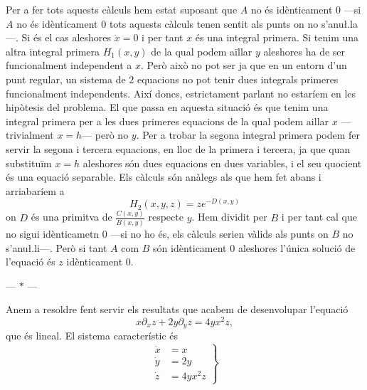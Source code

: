 \documentclass[12pt]{article}
\numberwithin{table}{section}
\numberwithin{equation}{section}
\numberwithin{figure}{section}
\newcommand{\parbreak}{
	\begin{center}
		--- $\ast$ ---
	\end{center} 
}
\begin{document}
Per a fer tots aquests càlculs hem estat suposant que \( A \) no és idènticament 0 ---si \( A \) no és idènticament 0 tots aquests càlculs tenen sentit als punts on no s'anu\l.la---. Si és el cas aleshores \( \dot{x} = 0 \) i per tant \( x \) és una integral primera. Si tenim una altra integral primera \( H_1(x,y) \) de la qual podem aïllar \( y \) aleshores ha de ser funcionalment independent a \( x \). Però això no pot ser ja que en un entorn d'un punt regular, un sistema de \( 2 \) equacions no pot tenir dues integrals primeres funcionalment independents. Així doncs, estrictament parlant no estaríem en les hipòtesis del problema. El que passa en aquesta situació és que tenim una integral primera per a les dues primeres equacions de la qual podem aillar \( x \) ---trivialment \( x = h \)--- però no \( y \). Per a trobar la segona integral primera podem fer servir la segona i tercera equacions, en lloc de la primera i tercera, ja que quan substituïm \( x = h \) aleshores són dues equacions en dues variables, i el seu quocient és una equació separable. Els càlculs són anàlegs als que hem fet abans i arriabaríem a
\begin{equation*}
	H_2(x,y,z) = ze^{-D(x,y)}
\end{equation*}
on \( D \) és una primitva de \( \frac{C(x,y)}{B(x,y)} \) respecte \( y \). Hem dividit per \( B \) i per tant cal que no sigui idènticametn 0 ---si no ho és, els càlculs serien vàlids als punts on \( B \) no s'anu\l.li---. Però si tant \( A \) com \( B \) són idènticament 0 aleshores l'única solució de l'equació és \( z \) idènticament 0. 

\parbreak

Anem a resoldre fent servir els resultats que acabem de desenvolupar l'equació
\begin{equation*}
	x \partial_x z + 2y \partial_y z = 4yx^2 z,
\end{equation*}
que és lineal. El sistema característic és 
\begin{equation*}
	\left. 	
		\begin{aligned}
			\dot{x} & = x \\
			\dot{y} & = 2y \\
			\dot{z} & = 4yx^2z
		\end{aligned}
	\right\}
\end{equation*}
\end{document}
